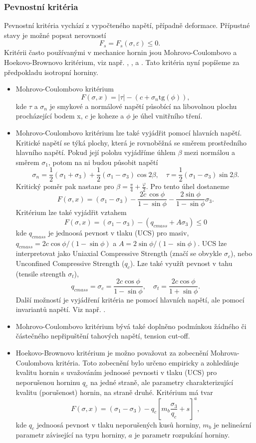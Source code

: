 \documentclass{article}
\begin{document}
\subsubsection{Pevnostní kritéria}
Pevnostní kritéria vychází z vypočteného napětí, případně deformace. Přípustné stavy je možné popsat nerovností
$$
	F_s = F_s(\sigma, \varepsilon) \leq 0.
$$
Kritérii často používanými v mechanice hornin jsou Mohrovo-Coulombovo a  Hoekovo-Brownovo  kritérium, viz např. 
\cite{Desai1984}, \cite{Goel2011}, \cite{Zang2010} a \cite{Brady2006}. Tato kritéria nyní popíšeme za předpokladu isotropní horniny.
\begin{itemize}
	\item Mohrovo-Coulombovo kritérium
		$$
			F (\sigma, x) = |\tau| - (c + \sigma_n \mbox{tg} (\phi)) ,
		$$
		kde $\tau$ a $\sigma_n$ je smykové a normálové napětí působící na libovolnou plochu procházející bodem x, $c$ je koheze a $\phi$ je úhel vnitřního tření.
	\item Mohrovo-Coulombovo kritérium lze také vyjádřit pomocí hlavních napětí. Kritické napětí se týká plochy, která je rovnoběžná se směrem prostředního hlavního napětí. Pokud její polohu vyjádříme úhlem $\beta$ mezi normálou a směrem $\sigma_1$, potom na ni budou působit napětí
		$$
			\sigma_n = \frac{1}{2}(\sigma_1 + \sigma_3 ) + \frac{1}{2}(\sigma_1 - \sigma_3 )\cos 2 \beta, \quad \tau = \frac{1}{2}(\sigma_1 - \sigma_3 ) \sin 2 \beta.
		$$
		Kritický poměr pak nastane pro $\beta =  \frac{\pi}{4} + \frac{\varphi}{2}$. Pro tento úhel dostaneme
		$$
			F(\sigma,x) = (\sigma_1 - \sigma_3 ) - \frac{2c\,\cos \phi}{1-\sin \phi} - \frac{2\sin \phi}{1-\sin \phi} \sigma_3 .
		$$
		Kritérium lze také vyjádřit vztahem
		$$
			F(\sigma, x) = (\sigma_1 - \sigma_3) - (q_{cmass} + A\sigma_3) \leq 0
		$$
		kde $q_{cmass}$ je jednoosá pevnost v tlaku (UCS) pro masiv, $q_{cmass} = 2c \cos \phi / (1-\sin \phi)$ a $A = 2 \sin \phi / (1-\sin \phi)$. UCS lze interpretovat jako Uniaxial Compressive Strength (značí se obvykle $\sigma_c$), nebo Unconfined Compressive Strength ($q_c$). Lze také využít pevnost v tahu (tensile strength $\sigma_t$),
		$$
			q_{cmass} = \sigma_c = \frac{2c \cos \phi}{1-\sin \phi}, \quad \sigma_t = \frac{2c \cos \phi}{1+ \sin \phi}.
		$$
		Další možností je vyjádření kritéria ne pomocí hlavních napětí, ale pomocí invariantů napětí. Viz např. \cite{Desai1984}.
	\item Mohrovo-Coulombovo kritérium bývá také doplněno podmínkou žádného či částečného nepřipuštění tahových napětí, tension cut-off.
	\item Hoekovo-Brownovo kritérium je možno považovat za zobecnění Mohrova-Coulombova kritéria. Toto zobecnění bylo určeno empiricky a zohledňuje kvalitu hornin s 						uvažováním jednoosé pevnosti v tlaku (UCS) pro neporušenou horninu $q_c$ na jedné straně, ale parametry charakterizující kvalitu (porušenost) hornin, na straně druhé. 					Kritérium má tvar
		$$
			F(\sigma,x)=(\sigma_1 - \sigma_3 ) - q_c \left[m_b \frac{\sigma_3}{q_c} + s \right]^a ,
		$$
		kde $q_{c}$ jednoosá pevnost v tlaku neporušených kusů horniny, $m_b$ je nelineární parametr závisející na typu horniny, $a$ je parametr rozpukání horniny.
\end{itemize}
\end{document}

